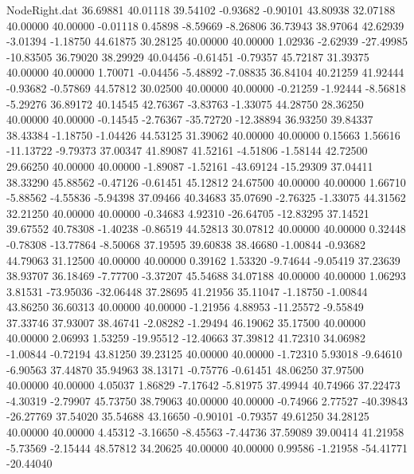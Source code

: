 \begin{filecontents}{NodeRight.dat}
  36.69881   40.01118   39.54102    -0.93682   -0.90101   43.80938   32.07188   40.00000   40.00000   -0.01118    0.45898   -8.59669   -8.26806
  36.73943   38.97064   42.62939    -3.01394   -1.18750   44.61875   30.28125   40.00000   40.00000    1.02936   -2.62939  -27.49985  -10.83505
  36.79020   38.29929   40.04456    -0.61451   -0.79357   45.72187   31.39375   40.00000   40.00000    1.70071   -0.04456   -5.48892   -7.08835
  36.84104   40.21259   41.92444    -0.93682   -0.57869   44.57812   30.02500   40.00000   40.00000   -0.21259   -1.92444   -8.56818   -5.29276
  36.89172   40.14545   42.76367    -3.83763   -1.33075   44.28750   28.36250   40.00000   40.00000   -0.14545   -2.76367  -35.72720  -12.38894
  36.93250   39.84337   38.43384    -1.18750   -1.04426   44.53125   31.39062   40.00000   40.00000    0.15663    1.56616  -11.13722   -9.79373
  37.00347   41.89087   41.52161    -4.51806   -1.58144   42.72500   29.66250   40.00000   40.00000   -1.89087   -1.52161  -43.69124  -15.29309
  37.04411   38.33290   45.88562    -0.47126   -0.61451   45.12812   24.67500   40.00000   40.00000    1.66710   -5.88562   -4.55836   -5.94398
  37.09466   40.34683   35.07690    -2.76325   -1.33075   44.31562   32.21250   40.00000   40.00000   -0.34683    4.92310  -26.64705  -12.83295
  37.14521   39.67552   40.78308    -1.40238   -0.86519   44.52813   30.07812   40.00000   40.00000    0.32448   -0.78308  -13.77864   -8.50068
  37.19595   39.60838   38.46680    -1.00844   -0.93682   44.79063   31.12500   40.00000   40.00000    0.39162    1.53320   -9.74644   -9.05419
  37.23639   38.93707   36.18469    -7.77700   -3.37207   45.54688   34.07188   40.00000   40.00000    1.06293    3.81531  -73.95036  -32.06448
  37.28695   41.21956   35.11047    -1.18750   -1.00844   43.86250   36.60313   40.00000   40.00000   -1.21956    4.88953  -11.25572   -9.55849
  37.33746   37.93007   38.46741    -2.08282   -1.29494   46.19062   35.17500   40.00000   40.00000    2.06993    1.53259  -19.95512  -12.40663
  37.39812   41.72310   34.06982    -1.00844   -0.72194   43.81250   39.23125   40.00000   40.00000   -1.72310    5.93018   -9.64610   -6.90563
  37.44870   35.94963   38.13171    -0.75776   -0.61451   48.06250   37.97500   40.00000   40.00000    4.05037    1.86829   -7.17642   -5.81975
  37.49944   40.74966   37.22473    -4.30319   -2.79907   45.73750   38.79063   40.00000   40.00000   -0.74966    2.77527  -40.39843  -26.27769
  37.54020   35.54688   43.16650    -0.90101   -0.79357   49.61250   34.28125   40.00000   40.00000    4.45312   -3.16650   -8.45563   -7.44736
  37.59089   39.00414   41.21958    -5.73569   -2.15444   48.57812   34.20625   40.00000   40.00000    0.99586   -1.21958  -54.41771  -20.44040

\end{filecontents}
